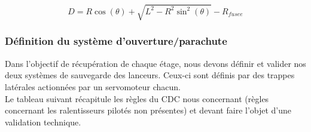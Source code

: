 \begin{equation}
    \boxed{D = R \cos(\theta) + \sqrt{L^2 - R^2 \sin^2(\theta)} - R_{fusee}}
\end{equation}


\newpage


\newpage

\subsubsection{Définition du système d'ouverture/parachute}
\label{subsec:defpara}

Dans l'objectif de récupération de chaque étage, nous devons définir et valider nos deux systèmes de sauvegarde des lanceurs.
Ceux-ci sont définis par des trappes latérales actionnées par un servomoteur chacun.\\

Le tableau suivant récapitule les règles du \acrshort{CDC} nous concernant (règles concernant les ralentisseurs pilotés non
présentes) et devant faire l'objet d'une validation technique.


